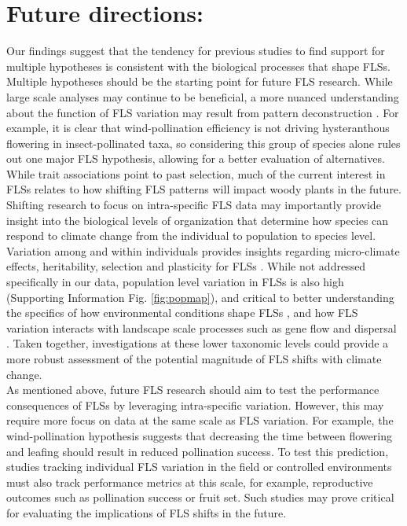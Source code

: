 \documentclass[11pt]{article}
\begin{document}
\section*{Future directions:}
\noindent Our findings suggest that the tendency for previous studies to find support for multiple hypotheses \citep{Bolmgren2003,Gougherty2018,Savage2019} is consistent with the biological processes that shape FLSs. Multiple hypotheses should be the starting point for future FLS research. While large scale analyses may continue to be beneficial, a more nuanced understanding about the function of FLS variation may result from pattern deconstruction \citep[i.e. grouping of species according to sub-clades or trait commonalities,][]{Terribile2009}. For example, it is clear that wind-pollination efficiency is not driving hysteranthous flowering in insect-pollinated taxa, so considering this group of species alone rules out one major FLS hypothesis, allowing for a better evaluation of alternatives.\\ 

\noindent While trait associations point to past selection, much of the current interest in FLSs relates to how shifting FLS patterns will impact woody plants in the future. Shifting research to focus on intra-specific FLS data may importantly provide insight into the biological levels of organization that determine how species can respond to climate change from the individual to population to species level. Variation among and within individuals provides insights regarding  micro-climate effects, heritability, selection and plasticity for FLSs \citep{Denechere2019}.  While not addressed specifically in our data, population level variation in FLSs is also high (Supporting Information Fig. \ref{fig:popmap}), and critical to better understanding the specifics of how environmental conditions shape FLSs \citep{Vitasse2009}, and how FLS variation interacts with landscape scale processes such as gene flow and dispersal \citep{Manel2003}. Taken together, investigations at these lower taxonomic levels could provide a more robust assessment of the potential magnitude of FLS shifts with climate change.\\

\noindent As mentioned above, future FLS research should aim to test the performance consequences of FLSs by leveraging intra-specific variation. However, this may require more focus on data at the same scale as FLS variation. For example, the wind-pollination hypothesis suggests that decreasing the time between flowering and leafing should result in reduced pollination success. To test this prediction, studies tracking individual FLS variation  in the field or controlled environments must also track performance metrics at this scale, for example, reproductive outcomes such as pollination success or fruit set. Such studies may prove critical for evaluating the implications of FLS shifts in the future. \\
\end{document}
